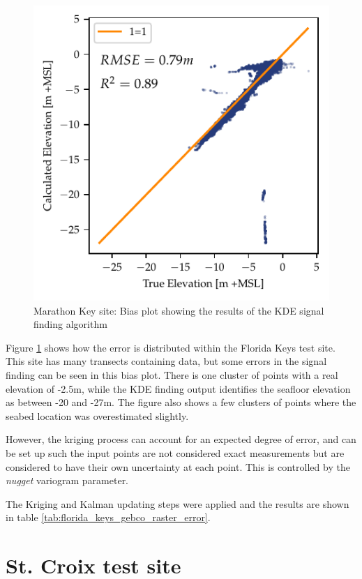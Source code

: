 \begin{figure}[h]
    \centering
    \includegraphics{figures/florida_keys_lidar_estimated_vs_truth.pdf}
    \caption{Marathon Key site: Bias plot showing the results of the KDE signal finding algorithm}
    \label{fig:keys-biasplot}
\end{figure}

Figure \ref{fig:keys-biasplot} shows how the error is distributed within the Florida Keys test site. This site has many transects containing data, but some errors in the signal finding can be seen in this bias plot. There is one cluster of points with a real elevation of -2.5m, while the KDE finding output identifies the seafloor elevation as between -20 and -27m.  The figure also shows a few clusters of points where the seabed location was overestimated slightly. 

However, the kriging process can account for an expected degree of error, and can be set up such the input points are not considered exact measurements but are considered to have their own uncertainty at each point. This is controlled by the \emph{nugget} variogram parameter. 


The Kriging and Kalman updating steps were applied and the results are shown in table \ref{tab:florida_keys_gebco_raster_error}.




\section{St. Croix test site}

